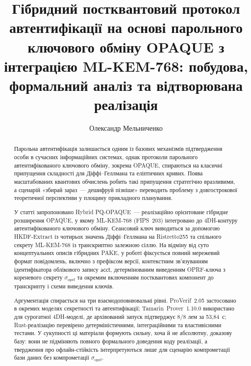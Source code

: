 \documentclass{llncs}
\newcommand{\acct}{\mathsf{acct}}
\newcommand{\sigoprf}{\sigma_{\mathrm{oprf}}}
\begin{document}

\title{Гібридний постквантовий протокол автентифікації на основі
парольного ключового обміну OPAQUE з інтеграцією ML-KEM-768:
побудова, формальний аналіз та відтворювана реалізація}

\author{Олександр Мельниченко}


\maketitle

\begin{abstract}
Парольна автентифікація залишається одним із базових механізмів
підтвердження особи в сучасних інформаційних системах, однак
протоколи парольного автентифікованого ключового обміну, зокрема
OPAQUE, спираються на класичні припущення складності для
Діффі--Геллмана та еліптичних кривих. Поява масштабованих квантових
обчислень робить такі припущення стратегічно вразливими, а сценарій
«збирай зараз~--- дешифруй пізніше» переводить проблему з
довгострокової теоретичної перспективи у площину прикладного
планування.

У статті запропоновано Hybrid PQ-OPAQUE~--- реалізаційно орієнтоване
гібридне розширення OPAQUE, у якому ML-KEM-768 (FIPS~203) інтегровано
до 4DH-контуру автентифікованого ключового обміну. Сеансовий ключ
виводиться за допомогою HKDF-Extract із чотирьох значень
Діффі--Геллмана на Ristretto255 та спільного секрету ML-KEM-768 із
транскриптно залежною сіллю. На відміну від суто концептуальних описів
гібридних PAKE, у роботі фіксується повний мережевий формат
повідомлень, включно з префіксом версії, контекстним зв'язуванням
ідентифікатора облікового запису $\acct$, детермінованим виведенням
OPRF-ключа з кореневого секрету $\sigoprf$ та окремим включенням
постквантових компонент до транскрипту і схеми виведення ключів.

Аргументація спирається на три взаємодоповнювальні рівні. ProVerif~2.05
застосовано в окремих моделях секретності та автентифікації;
Tamarin~Prover~1.10.0 використано для сурогатної 4DH-моделі, де
архівований запуск підтверджує 8/8 лем за 53,84~с; Rust-реалізацію
перевірено детерміністичними, інтеграційними та властивісними тестами.
У сукупності ці матеріали формують сильну, хоча й не абсолютну,
доказову базу: вони не підміняють повного формального доведення коду
реалізації, а твердження про офлайн-стійкість інтерпретуються лише для
сценарію компрометації бази даних без компрометації $\sigoprf$.


\end{abstract}
\end{document}
